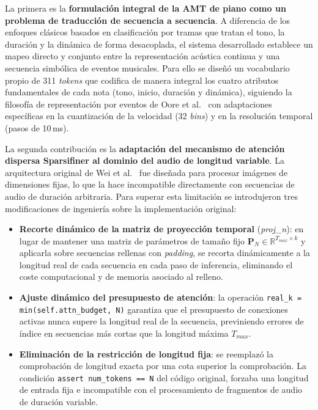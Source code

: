 La primera es la \textbf{formulación integral de la AMT de piano como
un problema de traducción de secuencia a secuencia}. A diferencia de
los enfoques clásicos basados en clasificación por tramas que tratan
el tono, la duración y la dinámica de forma desacoplada, el sistema
desarrollado establece un mapeo directo y conjunto entre la
representación acústica continua y una secuencia simbólica de eventos
musicales. Para ello se diseñó un vocabulario propio de 311
\textit{tokens} que codifica de manera integral los cuatro atributos
fundamentales de cada nota (tono, inicio, duración y dinámica),
siguiendo la filosofía de representación por eventos de Oore et al.\
\cite{oore2020time} con adaptaciones específicas en la cuantización de
la velocidad (32 \textit{bins}) y en la resolución temporal
(pasos de 10\,ms).

La segunda contribución es la \textbf{adaptación del mecanismo de
atención dispersa Sparsifiner al dominio del audio de longitud
variable}. La arquitectura original de Wei et al.\
\cite{wei2023sparsifiner} fue diseñada para procesar imágenes de
dimensiones fijas, lo que la hace incompatible directamente con
secuencias de audio de duración arbitraria. Para superar esta
limitación se introdujeron tres modificaciones de ingeniería sobre la
implementación original:

\begin{itemize}
    \item \textbf{Recorte dinámico de la matriz de proyección temporal}
    (\textit{proj\_n}): en lugar de mantener una matriz de parámetros
    de tamaño fijo $\mathbf{P}_N \in \mathbb{R}^{T_{max} \times k}$
    y aplicarla sobre secuencias rellenas con \textit{padding}, se
    recorta dinámicamente a la longitud real de cada secuencia en cada
    paso de inferencia, eliminando el coste computacional y de memoria
    asociado al relleno.

    \item \textbf{Ajuste dinámico del presupuesto de atención}:
    la operación \newline \texttt{real\_k = min(self.attn\_budget, N)} garantiza
    que el presupuesto de conexiones activas nunca supere la longitud
    real de la secuencia, previniendo errores de índice en secuencias
    más cortas que la longitud máxima $T_{max}$.

    \item \textbf{Eliminación de la restricción de longitud fija}:
    se reemplazó la comprobación de longitud exacta por una cota superior la comprobación. La condición \texttt{assert num\_tokens == N} del código original, forzaba una longitud de entrada fija e
    incompatible con el procesamiento de fragmentos de audio de
    duración variable.
\end{itemize}

